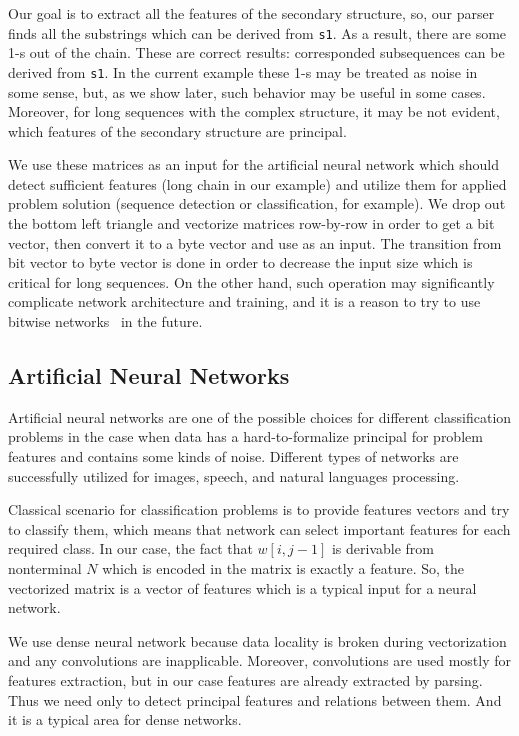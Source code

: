 \documentclass[a4paper,twoside]{article}
\begin{document}
Our goal is to extract all the features of the secondary structure, so, our parser finds all the substrings which can be derived from \verb|s1|.
As a result, there are some 1-s out of the chain.
These are correct results: corresponded subsequences can be derived from \verb|s1|. 
In the current example these 1-s may be treated as noise in some sense, but, as we show later, such behavior may be useful in some cases.
Moreover, for long sequences with the complex structure, it may be not evident, which features of the secondary structure are principal.

We use these matrices as an input for the artificial neural network which should detect sufficient features (long chain in our example) and utilize them for applied problem solution (sequence detection or classification, for example).
We drop out the bottom left triangle and vectorize matrices row-by-row in order to get a bit vector, then convert it to a byte vector and use as an input.
The transition from bit vector to byte vector is done in order to decrease the input size which is critical for long sequences. 
On the other hand, such operation may significantly complicate network architecture and training, and it is a reason to try to use bitwise networks~\cite{DBLP:journals:corr:KimS16} in the future.  

\subsection{Artificial Neural Networks}

\noindent Artificial neural networks are one of the possible choices for different classification problems in the case when data has a hard-to-formalize principal for problem features and contains some kinds of noise. Different types of networks are successfully utilized for images, speech, and natural languages processing.

Classical scenario for classification problems is to provide features vectors and try to classify them, which means that network can select important features for each required class.
In our case, the fact that $w[i,j-1]$ is derivable from nonterminal $N$ which is encoded in the matrix is exactly a feature.
So, the vectorized matrix is a vector of features which is a typical input for a neural network.

We use dense neural network because data locality is broken during vectorization and any convolutions are inapplicable.
Moreover, convolutions are used mostly for features extraction, but in our case features are already extracted by parsing.
Thus we need only to detect principal features and relations between them.
And it is a typical area for dense networks.
\end{document}
